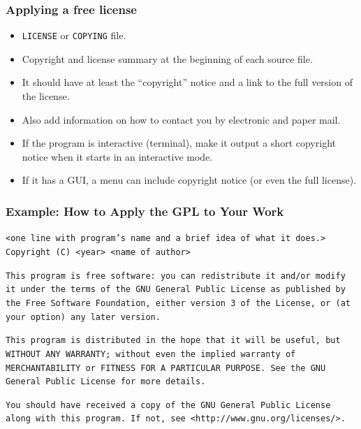 \begin{frame}
\frametitle{Applying a free license}


\begin{itemize}
\item \texttt{LICENSE} or \texttt{COPYING} file.
\item Copyright and license summary at the beginning of each source file.
\item It should have at least the ``copyright'' notice and a link to the full version of the license.
\item Also add information on how to contact you by electronic and paper mail.
\item If the program is interactive (terminal), make it output a short copyright notice 
when it starts in an interactive mode.
\item If it has a GUI, a menu can include copyright notice (or even the full license).
\end{itemize}

\end{frame}


\begin{frame}
\frametitle{Example: How to Apply the GPL to Your Work}

\footnotesize

\texttt{<one line with program's name and a brief idea of what it does.>} \\
\texttt{Copyright (C) <year>  <name of author>}

\medskip

\texttt{This program is free software: you can redistribute it and/or modify
    it under the terms of the GNU General Public License as published by
    the Free Software Foundation, either version 3 of the License, or
    (at your option) any later version.}

\medskip

\texttt{This program is distributed in the hope that it will be useful,
    but WITHOUT ANY WARRANTY; without even the implied warranty of
    MERCHANTABILITY or FITNESS FOR A PARTICULAR PURPOSE.  See the
    GNU General Public License for more details.}

\medskip

\texttt{You should have received a copy of the GNU General Public License
    along with this program.  If not, see <http://www.gnu.org/licenses/>.}


\end{frame}

